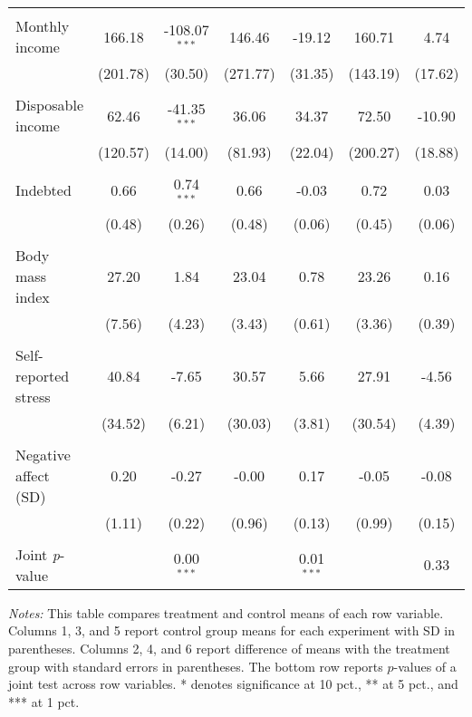 \begin{table}[htbp]
{\begin{threeparttable}
\begin{tabular}{l*{6}{c}}
          &         &         &         &         &         &         \\
Monthly income&   166.18&-108.07$^{***}$&   146.46&   -19.12&   160.71&     4.74\\
          & (201.78)&  (30.50)& (271.77)&  (31.35)& (143.19)&  (17.62)\\
          &         &         &         &         &         &         \\
Disposable income&    62.46&-41.35$^{***}$&    36.06&    34.37&    72.50&   -10.90\\
          & (120.57)&  (14.00)&  (81.93)&  (22.04)& (200.27)&  (18.88)\\
          &         &         &         &         &         &         \\
Indebted  &     0.66&0.74$^{***}$&     0.66&    -0.03&     0.72&     0.03\\
          &   (0.48)&   (0.26)&   (0.48)&   (0.06)&   (0.45)&   (0.06)\\
          &         &         &         &         &         &         \\
Body mass index&    27.20&     1.84&    23.04&     0.78&    23.26&     0.16\\
          &   (7.56)&   (4.23)&   (3.43)&   (0.61)&   (3.36)&   (0.39)\\
          &         &         &         &         &         &         \\
Self-reported stress&    40.84&    -7.65&    30.57&     5.66&    27.91&    -4.56\\
          &  (34.52)&   (6.21)&  (30.03)&   (3.81)&  (30.54)&   (4.39)\\
          &         &         &         &         &         &         \\
Negative affect (SD)&     0.20&    -0.27&    -0.00&     0.17&    -0.05&    -0.08\\
          &   (1.11)&   (0.22)&   (0.96)&   (0.13)&   (0.99)&   (0.15)\\
          &         &         &         &         &         &         \\
\midrule Joint \emph{p}-value&         &0.00$^{***}$&         &0.01$^{***}$&         &     0.33\\
\bottomrule \end{tabular} \begin{tablenotes}[flushleft] \footnotesize \item \emph{Notes:} This table compares treatment and control means of each row variable. Columns 1, 3, and 5 report control group means for each experiment with SD in parentheses. Columns 2, 4, and 6 report difference of means with the treatment group with standard errors in parentheses. The bottom row reports \(p\)-values of a joint test across row variables.  * denotes significance at 10 pct., ** at 5 pct., and *** at 1 pct. \end{tablenotes} \end{threeparttable} } \end{table}
